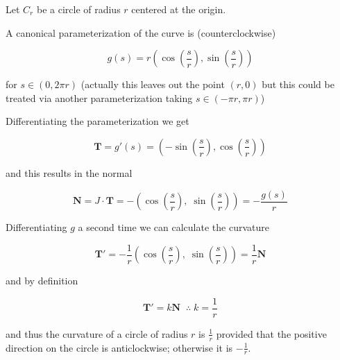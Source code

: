 \documentclass[12pt]{article}
\begin{document}
Let $C_r$ be a circle of radius $r$ centered at the origin.

A canonical parameterization of the curve is (counterclockwise)

$$ g(s) = r\left( \cos \left( \frac{s}{r} \right), \sin \left( \frac{s}{r}\right) \right) $$

for $s \in (0, 2\pi r)$ (actually this leaves out the point $(r,0)$ but this could be treated via another parameterization taking $s \in (-\pi r, \pi r)$)

Differentiating the parameterization we get

$$ \mathbf{T} = g'(s) = \left( -\sin \left( \frac{s}{r} \right), \cos \left( \frac{s}{r}\right) \right)$$

and this results in the normal

$$\mathbf{N} = J \cdot\mathbf{T} = -\left(\cos\left(\frac{s}{r}\right),\;\sin\left(\frac{s}{r}\right)\right) 
= -\frac{g(s)}{r}$$

Differentiating $g$ a second time we can calculate the curvature

$$\mathbf{T}' = -\frac{1}{r}\left(\cos\left(\frac{s}{r}\right),\;\sin\left(\frac{s}{r}\right)\right) =  \frac{1}{r} \mathbf{N}$$

and by definition

$$ \mathbf{T}' = k\mathbf{N}\;\; \therefore\; k = \frac{1}{r} $$

and thus the curvature of a circle of radius $r$ is $\displaystyle{\frac{1}{r}}$ provided that the positive direction on the circle is anticlockwise; otherwise it is $\displaystyle{-\frac{1}{r}}$.
\end{document}
